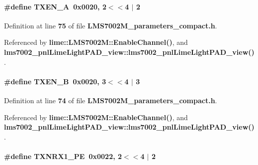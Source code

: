 \paragraph[{T\+X\+E\+N\+\_\+A}]{\setlength{\rightskip}{0pt plus 5cm}\#define T\+X\+E\+N\+\_\+A~0x0020, 2$<$$<$4 $\vert$  2}\label{LMS7002M__parameters__compact_8h_a8d2a0162ed3fd6ca54d92e6e0d18c4a1}


Definition at line {\bf 75} of file {\bf L\+M\+S7002\+M\+\_\+parameters\+\_\+compact.\+h}.



Referenced by {\bf lime\+::\+L\+M\+S7002\+M\+::\+Enable\+Channel()}, and {\bf lms7002\+\_\+pnl\+Lime\+Light\+P\+A\+D\+\_\+view\+::lms7002\+\_\+pnl\+Lime\+Light\+P\+A\+D\+\_\+view()}.

\paragraph[{T\+X\+E\+N\+\_\+B}]{\setlength{\rightskip}{0pt plus 5cm}\#define T\+X\+E\+N\+\_\+B~0x0020, 3$<$$<$4 $\vert$  3}\label{LMS7002M__parameters__compact_8h_a7755779b9935b2ed91c704319b7a91b7}


Definition at line {\bf 74} of file {\bf L\+M\+S7002\+M\+\_\+parameters\+\_\+compact.\+h}.



Referenced by {\bf lime\+::\+L\+M\+S7002\+M\+::\+Enable\+Channel()}, and {\bf lms7002\+\_\+pnl\+Lime\+Light\+P\+A\+D\+\_\+view\+::lms7002\+\_\+pnl\+Lime\+Light\+P\+A\+D\+\_\+view()}.

\paragraph[{T\+X\+N\+R\+X1\+\_\+\+PE}]{\setlength{\rightskip}{0pt plus 5cm}\#define T\+X\+N\+R\+X1\+\_\+\+PE~0x0022, 2$<$$<$4 $\vert$  2}\label{LMS7002M__parameters__compact_8h_a479560df1d7f9dbc2f95c3e42d085b24}



